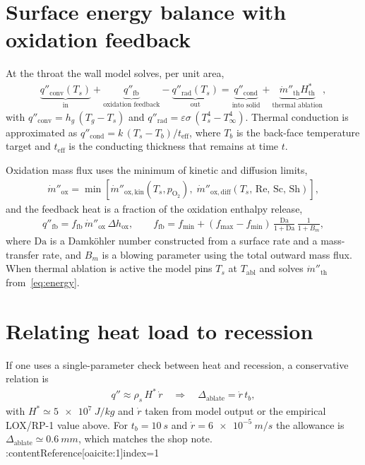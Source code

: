 \documentclass[11pt]{article}
\begin{document}
\section{Surface energy balance with oxidation feedback}
At the throat the wall model solves, per unit area,
\begin{align}
  \underbrace{q''_{\mathrm{conv}}(T_s)}_{\text{in}}
  + \underbrace{q''_{\mathrm{fb}}}_{\text{oxidation feedback}}
  - \underbrace{q''_{\mathrm{rad}}(T_s)}_{\text{out}}
  = \underbrace{q''_{\mathrm{cond}}}_{\text{into solid}}
  + \underbrace{\dot m''_{\mathrm{th}} H^\ast_{\mathrm{th}}}_{\text{thermal ablation}},
  \label{eq:energy}
\end{align}
with $q''_{\mathrm{conv}}=h_g\,(T_g-T_s)$ and $q''_{\mathrm{rad}}=\varepsilon \sigma\,(T_s^4 - T_\infty^4)$. Thermal conduction is approximated as $q''_{\mathrm{cond}}=k\,(T_s - T_b)/t_{\mathrm{eff}}$, where $T_b$ is the back-face temperature target and $t_{\mathrm{eff}}$ is the conducting thickness that remains at time $t$.

Oxidation mass flux uses the minimum of kinetic and diffusion limits,
\begin{align}
 \dot m''_{\mathrm{ox}} = \min\!\left[
 \dot m''_{\mathrm{ox,kin}}(T_s,p_{\mathrm{O_2}}),\;
 \dot m''_{\mathrm{ox,diff}}(T_s,\,\mathrm{Re},\,\mathrm{Sc},\,\mathrm{Sh})\right],
\end{align}
and the feedback heat is a fraction of the oxidation enthalpy release,
\begin{align}
 q''_{\mathrm{fb}} = f_{\mathrm{fb}}\,\dot m''_{\mathrm{ox}}\,\Delta h_{\mathrm{ox}},
 \qquad
 f_{\mathrm{fb}} = f_{\min} + (f_{\max}-f_{\min})\,
 \frac{\mathrm{Da}}{1+\mathrm{Da}}\,\frac{1}{1+B_m},
\end{align}
where $\mathrm{Da}$ is a Damköhler number constructed from a surface rate and a mass-transfer rate, and $B_m$ is a blowing parameter using the total outward mass flux. When thermal ablation is active the model pins $T_s$ at $T_{\mathrm{abl}}$ and solves $\dot m''_{\mathrm{th}}$ from~\eqref{eq:energy}.

\section{Relating heat load to recession}
If one uses a single-parameter check between heat and recession, a conservative relation is
\begin{align}
  q'' \approx \rho_s\,H^\ast\,\dot r
  \quad \Rightarrow \quad
  \Delta_{\mathrm{ablate}} = \dot r\,t_b,
  \label{eq:q_to_rdot}
\end{align}
with $H^\ast\simeq \SI{5e7}{J/kg}$ and $\dot r$ taken from model output or the empirical LOX/RP-1 value above. For $t_b=\SI{10}{s}$ and $\dot r=\SI{6e-5}{m/s}$ the allowance is $\Delta_{\mathrm{ablate}}\simeq \SI{0.6}{mm}$, which matches the shop note. :contentReference[oaicite:1]{index=1}
\end{document}

